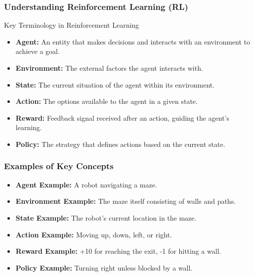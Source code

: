 \documentclass[aspectratio=169]{beamer}
\begin{document}
\begin{frame}[fragile]
    \frametitle{Understanding Reinforcement Learning (RL)}
    \begin{block}{Key Terminology in Reinforcement Learning}
        \begin{itemize}
            \item \textbf{Agent:} An entity that makes decisions and interacts with an environment to achieve a goal.
            \item \textbf{Environment:} The external factors the agent interacts with.
            \item \textbf{State:} The current situation of the agent within its environment.
            \item \textbf{Action:} The options available to the agent in a given state.
            \item \textbf{Reward:} Feedback signal received after an action, guiding the agent's learning.
            \item \textbf{Policy:} The strategy that defines actions based on the current state.
        \end{itemize}
    \end{block}
\end{frame}

\begin{frame}[fragile]
    \frametitle{Examples of Key Concepts}
    \begin{itemize}
        \item \textbf{Agent Example:} A robot navigating a maze.
        \item \textbf{Environment Example:} The maze itself consisting of walls and paths.
        \item \textbf{State Example:} The robot's current location in the maze.
        \item \textbf{Action Example:} Moving up, down, left, or right.
        \item \textbf{Reward Example:} +10 for reaching the exit, -1 for hitting a wall.
        \item \textbf{Policy Example:} Turning right unless blocked by a wall.
    \end{itemize}
\end{frame}
\end{document}
